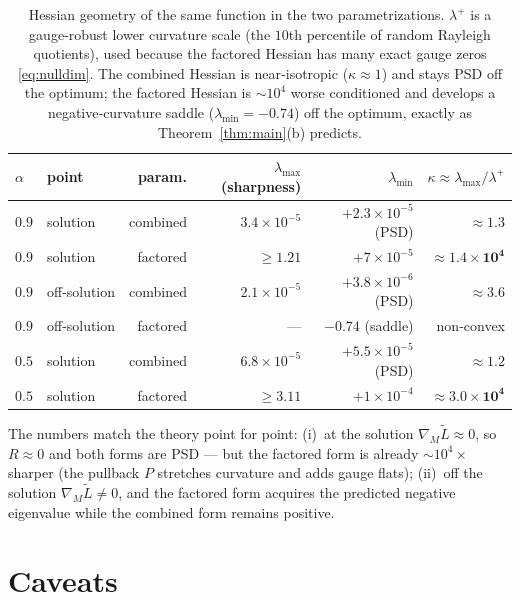 \documentclass[11pt]{article}
\theoremstyle{remark}
\begin{document}
\begin{table}[h]
\centering
\small
\begin{tabular}{llrrrr}
\toprule
$\alpha$ & point & param. & $\lambda_{\max}$ (sharpness) & $\lambda_{\min}$ & $\kappa\approx\lambda_{\max}/\lambda^{+}$ \\
\midrule
$0.9$ & solution      & combined & $3.4\times10^{-5}$ & $+2.3\times10^{-5}$ (PSD) & $\mathbf{\approx 1.3}$\\
$0.9$ & solution      & factored & $\ge 1.21$          & $+7\times10^{-5}$         & $\mathbf{\approx 1.4\times10^{4}}$\\
$0.9$ & off‑solution  & combined & $2.1\times10^{-5}$ & $+3.8\times10^{-6}$ (PSD)  & $\approx 3.6$\\
$0.9$ & off‑solution  & factored & ---                & $\mathbf{-0.74}$ (saddle)  & non‑convex\\
\midrule
$0.5$ & solution      & combined & $6.8\times10^{-5}$ & $+5.5\times10^{-5}$ (PSD) & $\mathbf{\approx 1.2}$\\
$0.5$ & solution      & factored & $\ge 3.11$          & $+1\times10^{-4}$         & $\mathbf{\approx 3.0\times10^{4}}$\\
\bottomrule
\end{tabular}
\caption{Hessian geometry of the same function in the two parametrizations.
$\lambda^{+}$ is a gauge‑robust lower curvature scale (the $10$th percentile of
random Rayleigh quotients), used because the factored Hessian has many exact
gauge zeros \eqref{eq:nulldim}. The combined Hessian is near‑isotropic
($\kappa\approx1$) and stays PSD off the optimum; the factored Hessian is
$\sim\!10^4$ worse conditioned and develops a negative‑curvature saddle
($\lambda_{\min}=-0.74$) off the optimum, exactly as Theorem~\ref{thm:main}(b)
predicts.}
\label{tab:hess}
\end{table}

The numbers match the theory point for point: (i)~at the solution
$\nabla_M\widetilde L\approx0$, so $R\approx0$ and both forms are PSD --- but the
factored form is already $\sim\!10^4\times$ sharper (the pullback $P$ stretches
curvature and adds gauge flats); (ii)~off the solution $\nabla_M\widetilde L\neq0$,
and the factored form acquires the predicted negative eigenvalue while the
combined form remains positive.

\section{Caveats}
\end{document}
